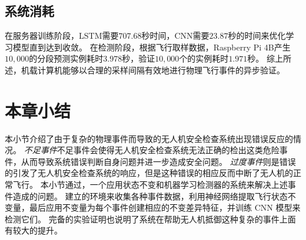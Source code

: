 \subsection{系统消耗}
在服务器训练阶段，LSTM需要$707.68$秒时间，CNN需要$23.87$秒的时间来优化学习模型直到达到收敛。
在检测阶段，根据飞行取样数据，Raspberry Pi 4B产生$10,000$的分段预测实例耗时$3.978$秒，验证$10,000$个的实例耗时$1.971$秒。
综上所述，机载计算机能够以合理的采样间隔有效地进行物理飞行事件的异步验证。

\section{本章小结}
本小节介绍了由于复杂的物理事件而导致的无人机安全检查系统出现错误反应的情况。
\emph{不足事件}不足事件会使得无人机安全检查系统无法正确的检出这类危险事件，从而导致系统错误判断自身问题并进一步造成安全问题。
\emph{过度事件}则是错误的引发了无人机安全检查系统的响应，但是这种错误的相应反而中断了无人机的正常飞行。
本小节通过\deccheck ，一个应用状态不变和机器学习检测器的系统来解决上述事件造成的问题。
\deccheck 建立的环境来收集各种事件数据，利用神经网络提取飞行状态不变量，最后应用不变量为每个事件创建相应的不变差异特征，并训练 CNN 模型来检测它们。
完备的实验证明也说明了\deccheck 系统在帮助无人机抵御这种复杂的事件上面有较大的提升。



